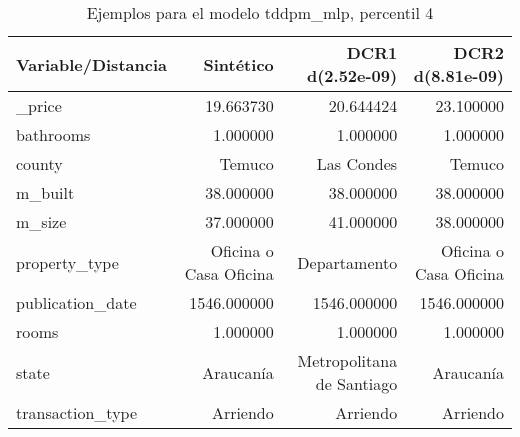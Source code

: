 \begin{table}[H]
\centering
\fontsize{10}{14}\selectfont
\caption{Ejemplos para el modelo tddpm\_mlp, percentil 4}
\label{table-example-economicos-a-3-tddpm_mlp-4p}
\begin{tabular}{|l|r|r|r|}
\hline
\rowcolor[gray]{0.8}
Variable/Distancia & Sintético & DCR1 d(2.52e-09) & DCR2 d(8.81e-09) \\
\hline \_price & \cellcolor[rgb]{0.9, 0.54, 0.52} 19.663730 & 20.644424 & 23.100000 \\
\hline bathrooms & \cellcolor[rgb]{0.9, 0.54, 0.52} 1.000000 & \cellcolor[rgb]{0.9, 0.54, 0.52} 1.000000 & \cellcolor[rgb]{0.9, 0.54, 0.52} 1.000000 \\
\hline county & \cellcolor[rgb]{0.9, 0.54, 0.52} Temuco & Las Condes & \cellcolor[rgb]{0.9, 0.54, 0.52} Temuco \\
\hline m\_built & \cellcolor[rgb]{0.9, 0.54, 0.52} 38.000000 & \cellcolor[rgb]{0.9, 0.54, 0.52} 38.000000 & \cellcolor[rgb]{0.9, 0.54, 0.52} 38.000000 \\
\hline m\_size & \cellcolor[rgb]{0.9, 0.54, 0.52} 37.000000 & 41.000000 & 38.000000 \\
\hline property\_type & \cellcolor[rgb]{0.9, 0.54, 0.52} Oficina o Casa Oficina & Departamento & \cellcolor[rgb]{0.9, 0.54, 0.52} Oficina o Casa Oficina \\
\hline publication\_date & \cellcolor[rgb]{0.9, 0.54, 0.52} 1546.000000 & \cellcolor[rgb]{0.9, 0.54, 0.52} 1546.000000 & \cellcolor[rgb]{0.9, 0.54, 0.52} 1546.000000 \\
\hline rooms & \cellcolor[rgb]{0.9, 0.54, 0.52} 1.000000 & \cellcolor[rgb]{0.9, 0.54, 0.52} 1.000000 & \cellcolor[rgb]{0.9, 0.54, 0.52} 1.000000 \\
\hline state & \cellcolor[rgb]{0.9, 0.54, 0.52} Araucanía & Metropolitana de Santiago & \cellcolor[rgb]{0.9, 0.54, 0.52} Araucanía \\
\hline transaction\_type & \cellcolor[rgb]{0.9, 0.54, 0.52} Arriendo & \cellcolor[rgb]{0.9, 0.54, 0.52} Arriendo & \cellcolor[rgb]{0.9, 0.54, 0.52} Arriendo \\
\hline
\end{tabular}
\end{table}
